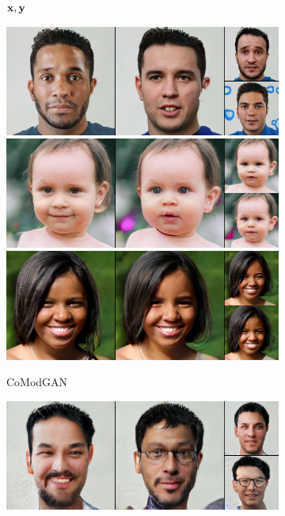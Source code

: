 \begin{figure}[t]
\begin{subfigure}[t]{0.22\textwidth}
      \caption*{\scriptsize ${\mathbf{x}}, {\mathbf{y}}$}
    \end{subfigure}
    \begin{subfigure}[t]{0.25\textwidth}
      \centering
      \includegraphics[height=\ffhqimgheight]{figs/cigcvae/image-samples/ffhq256/freeform_co_mod_gan_0_samples.jpg}
      \includegraphics[height=\ffhqimgheight]{figs/cigcvae/image-samples/ffhq256/freeform_co_mod_gan_13_samples.jpg}
      \includegraphics[height=\ffhqimgheight]{figs/cigcvae/image-samples/ffhq256/freeform_co_mod_gan_32_samples.jpg}
      \caption{\scriptsize CoModGAN}
    \end{subfigure}
    \begin{subfigure}[t]{0.25\textwidth}
      \centering
      \includegraphics[height=\ffhqimgheight]{figs/cigcvae/image-samples/ffhq256/freeform_pic_0_samples.jpg}

\end{subfigure}
\end{figure}
